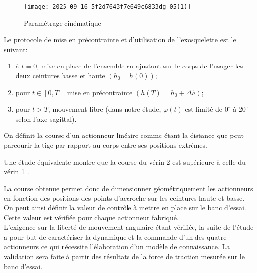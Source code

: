 

\begin{figure}[!h]
\centering
\texttt{[image: 2025\_09\_16\_5f2d7643f7e649c6833dg-05(1)]}
\caption{\label{ccs_mp_2023_fig_07} Paramétrage cinématique }
\end{figure}




Le protocole de mise en précontrainte et d'utilisation de l'exosquelette est le suivant:

\begin{enumerate}
  \item à $t=0$, mise en place de l'ensemble en ajustant sur le corps de l'usager les deux ceintures basse et haute $\left(h_{0}=h(0)\right)$;
  \item pour $t \in[0, T]$, mise en précontrainte $\left(h(T)=h_{0}+\Delta h\right)$;
  \item pour $t>T$, mouvement libre (dans notre étude, $\varphi(t)$ est limité de $0^{\circ}$ à $20^{\circ}$ selon l'axe sagittal).
\end{enumerate}

On définit la course d'un actionneur linéaire comme étant la distance que peut parcourir la tige par rapport au corps entre ses positions extrêmes.\\

\ifprof
\begin{corrige}
\end{corrige}
\else
\fi


Une étude équivalente montre que la course du vérin 2 est supérieure à celle du vérin 1 .

La course obtenue permet donc de dimensionner géométriquement les actionneurs en fonction des positions des points d'accroche sur les ceintures haute et basse. On peut ainsi définir la valeur de contrôle à mettre en place sur le banc d'essai. Cette valeur est vérifiée pour chaque actionneur fabriqué.\\
L'exigence sur la liberté de mouvement angulaire étant vérifiée, la suite de l'étude a pour but de caractériser la dynamique et la commande d'un des quatre actionneurs ce qui nécessite l'élaboration d'un modèle de connaissance. La validation sera faite à partir des résultats de la force de traction mesurée sur le banc d'essai.


